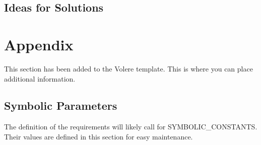 \documentclass[12pt, titlepage]{article}
\begin{document}
\subsection{Ideas for Solutions}





\newpage

\section{Appendix}

This section has been added to the Volere template.  This is where you can place
additional information.

\subsection{Symbolic Parameters}

The definition of the requirements will likely call for SYMBOLIC\_CONSTANTS.
Their values are defined in this section for easy maintenance.
\end{document}
